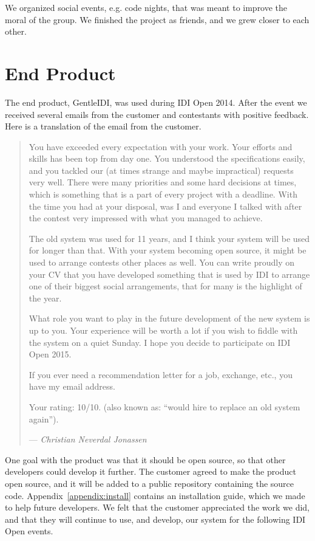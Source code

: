 We organized social events, e.g. code nights, that was meant to improve
the moral of the group. We finished the project as friends, and we grew
closer to each other.



\section{End Product}

The end product, GentleIDI, was used during IDI Open 2014. After the
event we received several emails from the customer and contestants with
positive feedback. Here is a translation of the email from
the customer.

\begin{quotation}
You have exceeded every expectation with your work.
Your efforts and skills has been top from day one. You understood the
specifications easily, and you tackled our (at times strange and maybe
impractical) requests very well. There were many priorities and some
hard decisions at times, which is something that is a part of every
project with a deadline. With the time you had at your disposal, was I
and everyone I talked with after the contest very impressed with what
you managed to achieve.

The old system was used for 11 years, and I think your system will be
used for longer than that. With your system becoming open source, it
might be used to arrange contests other places as well. You can write
proudly on your CV that you have developed something that is used by
IDI to arrange one of their biggest social arrangements, that for many
is the highlight of the year.

What role you want to play in the future development of the new system
is up to you. Your experience will be worth a lot if you wish to fiddle
with the system on a quiet Sunday. I hope you decide to participate on
IDI Open 2015.

If you ever need a recommendation letter for a job, exchange, etc., you
have my email address.

Your rating: 10/10. (also known as: ``would hire to
replace an old system again'').

\hfill--- \textit{Christian Neverdal Jonassen}
\end{quotation}

One goal with the product was that it should be open source, so that
other developers could develop it further. The customer agreed to make
the product open source, and it will be added to a public repository
containing the source code. Appendix~\ref{appendix:install} contains an installation guide, which we made to help future
developers. We felt that the customer appreciated the work we did, and
that they will continue to use, and develop, our system for the
following IDI Open events.

